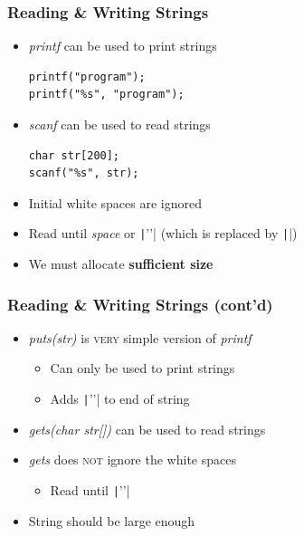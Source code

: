 \documentclass{../c-lecture}
\begin{document}
\begin{frame}[fragile]
  \frametitle{Reading \& Writing Strings}
  \begin{itemize}
    \item \textit{\color{SpringGreen} printf} can be used to print strings
    \begin{verbatim}
printf("program");
printf("%s", "program");
    \end{verbatim}
  \end{itemize}
  \begin{itemize}
    \item \textit{\color{LimeGreen} scanf} can be used to read strings
    \begin{verbatim}
char str[200];
scanf("%s", str);
    \end{verbatim}
    \item Initial white spaces are ignored
    \item
      Read until \textit{\color{Orange} space} or
      \texttt|'\n'| (which is replaced by \texttt|\0|)

    \item We must allocate \textbf{\color{RubineRed} sufficient size}
  \end{itemize}
\end{frame}

\begin{frame}
  \frametitle{Reading \& Writing Strings (cont’d)}
  \begin{itemize}
    \item
      \textit{\color{YellowOrange} puts(str)} is \textsc{\color{Cyan} very} simple version of
      \textit{\color{LimeGreen}printf}

    \begin{itemize}
      \item Can only be used to print strings
      \item Adds \texttt|'\n'| to end of string
    \end{itemize}
    \item
      \textit{\color{YellowOrange} gets(char str[])} can be used to read
      strings

    \item
      \textit{\color{YellowOrange} gets} does
      \textsc{\color{RubineRed} not} ignore the white spaces

    \begin{itemize}
      \item Read until \texttt|'\n'|
    \end{itemize}
    \item String should be large enough
  \end{itemize}
\end{frame}
\end{document}
